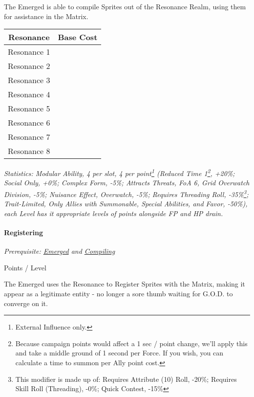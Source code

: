 \begin{multicols*}{3}
	The Emerged is able to compile Sprites out of the Resonance Realm, using them for assistance in the Matrix.
	
	
	\begin{center}
		\begin{tabular}{|c|c|}
			\hline
			Resonance & Base Cost\\
			\hline
			\hline
			Resonance 1 &  \\
			Resonance 2 &  \\
			Resonance 3 &  \\
			Resonance 4 &  \\
			Resonance 5 &  \\
			Resonance 6 &  \\
			Resonance 7 &  \\
			Resonance 8 &  \\
			\hline
		\end{tabular}
	\end{center}
	
	
	\textit{\textcolor{OliveGreen}{Statistics: Modular Ability, 4 per slot, 4 per point\footnote{External Influence only.} (Reduced Time 1\footnote{Because campaign points would affect a 1 sec / point change, we'll apply this and take a middle ground of 1 second per Force. If you wish, you can calculate a time to summon per Ally point cost.}, +20\%; Social Only, +0\%; Complex Form, -5\%; Attracts Threats, FoA 6, Grid Overwatch Division, -5\%; Nuisance Effect, Overwatch, -5\%; Requires Threading Roll, -35\%\footnote{This modifier is made up of: Requires Attribute (10) Roll, -20\%; Requires Skill Roll (Threading), -0\%; Quick Contest, -15\%}; Trait-Limited, Only Allies with Summonable, Special Abilities, and Favor, -50\%), each Level has it appropriate levels of points alongside FP and HP drain.}}

	\paragraph{Registering}\label{registering}
	\textit{Prerequisite: \hyperref[emerged]{Emerged} and \hyperref[compiling]{Compiling}}
	\begin{flushright}
		 Points / Level
	\end{flushright}
	
	The Emerged uses the Resonance to Register Sprites with the Matrix, making it appear as a legitimate entity - no longer a sore thumb waiting for G.O.D. to converge on it.
	

\end{multicols*}
